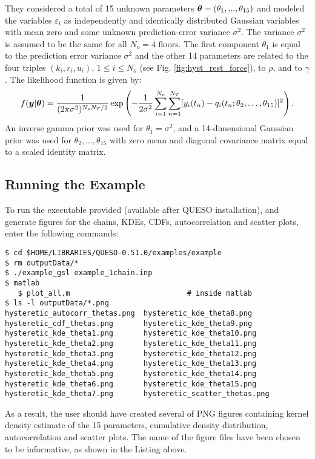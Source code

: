 They considered a total of 15 unknown parameters $\mbox{\boldmath$ \theta $} = (\theta_1 , . . . , \theta_{15})$ and modeled the variables $\varepsilon_i$ as independently and identically distributed Gaussian variables with mean zero and some unknown prediction-error variance $\sigma^2$. The variance $\sigma^2$ is assumed to be the same for all $N_o = 4$ floors.  The first component $\theta_1$ is equal to the prediction error variance $\sigma^2$ and the other 14 parameters are related to the four triples $(k_i, r_i, u_i),\, 1 \leq i \leq N_o$ (see Fig. \ref{fig:hyst_rest_force}), to $\rho$, and to $\gamma$. The likelihood function is given by:
\begin{equation}\label{eq:hyst:like}
 f(\mbox{\boldmath$ y $}|\mbox{\boldmath$ \theta $}) = \dfrac{1}{(2 \pi \sigma^2)^{N_oN_T/2}}\exp \left( -\dfrac{1}{2\sigma^2} \displaystyle \sum_{i=1}^{N_o} \sum_{n=1}^{N_T} [y_i(t_n) - {q}_i(t_n; \theta_2,\ldots,\theta_{15})]^2 \right).
\end{equation}
An inverse gamma  prior was used for $\theta_1=\sigma^2$, and a 14-dimensional Gaussian prior was used for $\theta_2 , ..., \theta_{15}$ with zero mean and diagonal covariance matrix equal to a scaled identity matrix.


\subsection{Running the Example}\label{sec:hysteretic-run}

To run the executable provided (available after QUESO installation), and generate figures for the chains, KDEs, CDFs, autocorrelation and scatter plots, enter the following commands:
\begin{lstlisting}[label={},caption={}]
$ cd $HOME/LIBRARIES/QUESO-0.51.0/examples/example
$ rm outputData/*
$ ./example_gsl example_1chain.inp    
$ matlab
   $ plot_all.m	                          # inside matlab   
$ ls -l outputData/*.png
hysteretic_autocorr_thetas.png  hysteretic_kde_theta8.png 
hysteretic_cdf_thetas.png       hysteretic_kde_theta9.png
hysteretic_kde_theta1.png       hysteretic_kde_theta10.png
hysteretic_kde_theta2.png       hysteretic_kde_theta11.png
hysteretic_kde_theta3.png       hysteretic_kde_theta12.png
hysteretic_kde_theta4.png       hysteretic_kde_theta13.png
hysteretic_kde_theta5.png       hysteretic_kde_theta14.png
hysteretic_kde_theta6.png       hysteretic_kde_theta15.png
hysteretic_kde_theta7.png       hysteretic_scatter_thetas.png
\end{lstlisting}


As a result, the user should have created several of PNG figures containing kernel density estimate of the 15 parameters, cumulative density distribution, autocorrelation and scatter plots. The name of the figure files have been chosen to be informative, as shown in the Listing above.

